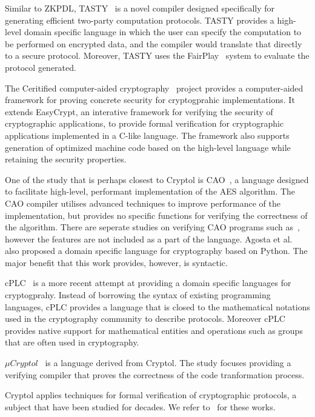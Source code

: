 \documentclass[a4paper, notitlepage]{report}
\begin{document}
Similar to ZKPDL, TASTY~\cite{henecka2010tasty} is a novel compiler
designed specifically for generating efficient two-party computation
protocols. TASTY provides a high-level domain specific language in which
the user can specify the computation to be performed on encrypted data, 
and the compiler would translate that directly to a secure protocol.
Moreover, TASTY uses the FairPlay~\cite{malkhi2004fairplay} system to
evaluate the protocol generated.

The Ceritified computer-aided cryptography~\cite{almeida2013certified} 
project provides a computer-aided framework for proving concrete security for
 cryptogprahic implementations. It extends EasyCrypt, an interative framework
for verifying the security of cryptographic applications, to
provide formal verification for cryptographic applications implemented 
in a C-like language. The framework also supports generation of 
optimized machine code based on the high-level language while
retaining the security properties.

One of the study that is perhaps closest to Cryptol is 
CAO~\cite{moss2010bridging}, a language designed to facilitate high-level,
performant implementation of the AES algorithm. The CAO compiler utilises
advanced techniques to improve performance of the implementation, but 
provides no specific functions for verifying the correctness of the algorithm.
There are seperate studies on verifying CAO programs such as~\cite{barbosa2010deductive},
however the features are not included as a part of the language.
Agosta et al.~\cite{agosta2007domain} also proposed a domain specific language
for cryptography based on Python. The major benefit that this work provides,
however, is syntactic.

cPLC~\cite{bangerter2011cplc} is a more recent attempt at providing a domain
specific languages for cryptogprahy. Instead of borrowing the syntax of existing
programming languages, cPLC provides a language that is closed to the 
mathematical notations used in the cryptography community to describe 
protocols. Moreover cPLC provides native support for mathematical entities
and operations such as groups that are often used in cryptography.

${\mu}Cryptol$~\cite{shields2006language,pike2006verifying} is a language
 derived from Cryptol. The 
study focuses providing a verifying compiler that proves the correctness
of the code tranformation process.

Cryptol applies techniques for formal verification of cryptographic protocols,
a subject that have been studied for decades. We refer to~\cite{meadows1994formal} for these works.
\end{document}
